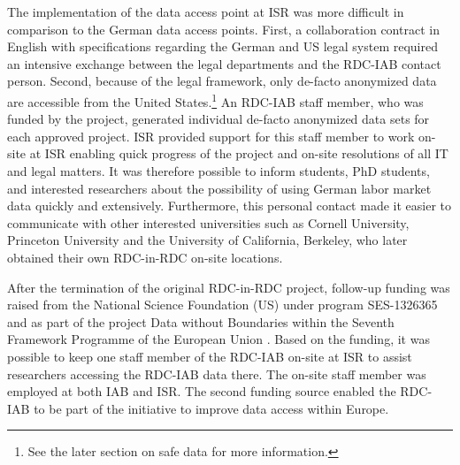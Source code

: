 The implementation of the data access point at ISR was more difficult in comparison to the German data access points. First, a collaboration contract in English with specifications regarding the German and US legal system required an intensive exchange between the legal departments and the RDC-IAB contact person. Second, because of the legal framework, only de-facto anonymized data are accessible from the United States.\footnote{See the later section on safe data for more information.} An RDC-IAB staff member, who was funded by the project, generated individual de-facto anonymized data sets for each approved project. ISR provided support for this staff member to work on-site at ISR enabling quick progress of the project and on-site resolutions of all IT and legal matters. It was therefore possible to inform students, PhD students, and interested researchers about the possibility of using German labor market data quickly and extensively. Furthermore, this personal contact made it easier to communicate with other interested universities such as Cornell University, Princeton University and the University of California, Berkeley, who later obtained their own RDC-in-RDC on-site locations.

After the termination of the original RDC-in-RDC project, follow-up funding was raised from the National Science Foundation (US) under program SES-1326365 and as part of the project Data without Boundaries within the Seventh Framework Programme of the European Union \citep{heining2012}. Based on the funding, it was possible to keep one staff member of the RDC-IAB on-site at ISR to assist researchers accessing the RDC-IAB data there. The on-site staff member was employed at both IAB and ISR. The second funding source enabled the RDC-IAB to be part of the initiative to improve data access within Europe.

